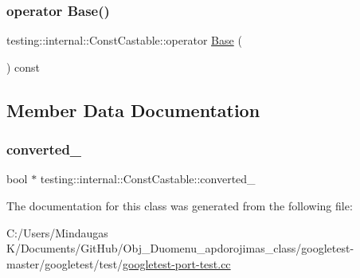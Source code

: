 \subsubsection{\texorpdfstring{operator Base()}{operator Base()}\hspace{0.1cm}{\footnotesize\ttfamily [3/3]}}
{\footnotesize\ttfamily testing\+::internal\+::\+Const\+Castable\+::operator \mbox{\hyperlink{class_base}{Base}} (\begin{DoxyParamCaption}{ }\end{DoxyParamCaption}) const\hspace{0.3cm}{\ttfamily [inline]}}



\subsection{Member Data Documentation}
\mbox{\label{classtesting_1_1internal_1_1_const_castable_a55ab99cae88b6cf81c14a9f22e7092b0}} 
\subsubsection{\texorpdfstring{converted\_}{converted\_}}
{\footnotesize\ttfamily bool $\ast$ testing\+::internal\+::\+Const\+Castable\+::converted\+\_\+\hspace{0.3cm}{\ttfamily [private]}}



The documentation for this class was generated from the following file\+:\begin{DoxyCompactItemize}
\item 
C\+:/\+Users/\+Mindaugas K/\+Documents/\+Git\+Hub/\+Obj\+\_\+\+Duomenu\+\_\+apdorojimas\+\_\+class/googletest-\/master/googletest/test/\mbox{\hyperlink{googletest-master_2googletest_2test_2googletest-port-test_8cc}{googletest-\/port-\/test.\+cc}}\end{DoxyCompactItemize}
